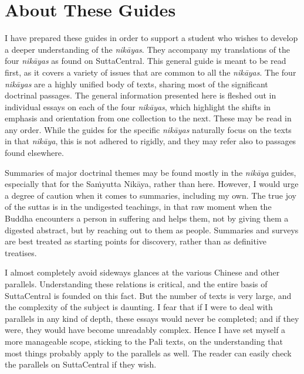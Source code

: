 \documentclass[12pt,openany]{book}%
\begin{document}
\section*{About These Guides}

I have prepared these guides in order to support a student who wishes to develop a deeper understanding of the \textit{\textsanskrit{nikāyas}}. They accompany my translations of the four \textit{\textsanskrit{nikāyas}} as found on SuttaCentral. This general guide is meant to be read first, as it covers a variety of issues that are common to all the \textit{\textsanskrit{nikāyas}}. The four \textit{\textsanskrit{nikāyas}} are a highly unified body of texts, sharing most of the significant doctrinal passages. The general information presented here is fleshed out in individual essays on each of the four \textit{\textsanskrit{nikāyas}}, which highlight the shifts in emphasis and orientation from one collection to the next. These may be read in any order. While the guides for the specific \textit{\textsanskrit{nikāyas}} naturally focus on the texts in that \textit{\textsanskrit{nikāya}}, this is not adhered to rigidly, and they may refer also to passages found elsewhere.

Summaries of major doctrinal themes may be found mostly in the \textit{\textsanskrit{nikāya}} guides, especially that for the \textsanskrit{Saṁyutta} \textsanskrit{Nikāya}, rather than here. However, I would urge a degree of caution when it comes to summaries, including my own. The true joy of the suttas is in the undigested teachings, in that raw moment when the Buddha encounters a person in suffering and helps them, not by giving them a digested abstract, but by reaching out to them as people. Summaries and surveys are best treated as starting points for discovery, rather than as definitive treatises.

I almost completely avoid sideways glances at the various Chinese and other parallels. Understanding these relations is critical, and the entire basis of SuttaCentral is founded on this fact. But the number of texts is very large, and the complexity of the subject is daunting. I fear that if I were to deal with parallels in any kind of depth, these essays would never be completed; and if they were, they would have become unreadably complex. Hence I have set myself a more manageable scope, sticking to the Pali texts, on the understanding that most things probably apply to the parallels as well. The reader can easily check the parallels on SuttaCentral if they wish.
\end{document}
